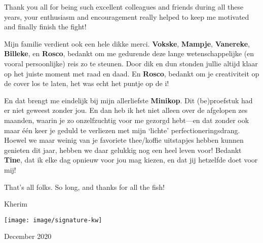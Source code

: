 Thank you all for being such excellent colleagues and friends during all these years, your enthusiasm and
encouragement really helped to keep me motivated and finally finish the fight!

Mijn familie verdient ook een hele dikke merci. \textbf{Vokske}, \textbf{Mampje}, \textbf{Vanereke},
\textbf{Billeke}, en \textbf{Rosco}, bedankt om me gedurende deze lange wetenschappelijke (en vooral
persoonlijke) reis zo te steunen. Door dik en dun stonden jullie altijd klaar op het juiste moment met raad en
daad. En \textbf{Rosco}, bedankt om je creativiteit op de cover los te laten, het was echt het puntje op de i!

En dat brengt me eindelijk bij mijn allerliefste \textbf{Minikop}. Dit (be)proefstuk had er niet geweest
zonder jou. En dan heb ik het niet alleen over de afgelopen zes maanden, waarin je zo onzelfzuchtig voor me
gezorgd hebt---en dat zonder ook maar \'{e}\'{e}n keer je geduld te verliezen met mijn `lichte'
perfectioneringsdrang. Hoewel we maar weinig van je favoriete thee/koffie uitstapjes hebben kunnen genieten
dit jaar, hebben we daar gelukkig nog een heel leven voor! Bedankt \textbf{Tine}, dat ik elke dag opnieuw voor
jou mag kiezen, en dat jij hetzelfde doet voor mij!


That's all folks. So long, and thanks for all the fish!

Kherim

\texttt{[image: image/signature-kw]}

December 2020



\cleardoublepage

